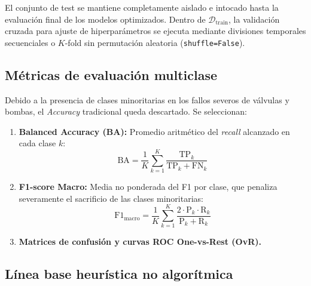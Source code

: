\documentclass[journal]{IEEEtran}
\begin{document}
El conjunto de test se mantiene completamente aislado e intocado hasta la evaluación final de los modelos optimizados. Dentro de $\mathcal{D}_{\text{train}}$, la validación cruzada para ajuste de hiperparámetros se ejecuta mediante divisiones temporales secuenciales o $K$-fold sin permutación aleatoria (\texttt{shuffle=False}).

\subsection{Métricas de evaluación multiclase}

Debido a la presencia de clases minoritarias en los fallos severos de válvulas y bombas, el \emph{Accuracy} tradicional queda descartado. Se seleccionan:
\begin{enumerate}[leftmargin=*]
    \item \textbf{Balanced Accuracy (BA):} Promedio aritmético del \emph{recall} alcanzado en cada clase $k$:
    \begin{equation}
        \text{BA} = \frac{1}{K}\sum_{k=1}^K \frac{\text{TP}_k}{\text{TP}_k + \text{FN}_k}
    \end{equation}
    \item \textbf{F1-score Macro:} Media no ponderada del F1 por clase, que penaliza severamente el sacrificio de las clases minoritarias:
    \begin{equation}
        \text{F1}_{\text{macro}} = \frac{1}{K}\sum_{k=1}^K \frac{2 \cdot \text{P}_k \cdot \text{R}_k}{\text{P}_k + \text{R}_k}
    \end{equation}
    \item \textbf{Matrices de confusión y curvas ROC One-vs-Rest (OvR).}
\end{enumerate}

\subsection{Línea base heurística no algorítmica}
\label{subsec:baseline_metodo}
\end{document}
